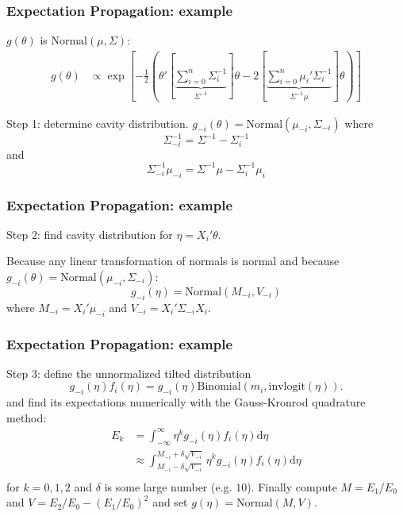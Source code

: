 \documentclass{beamer}
\begin{document}
\begin{frame}[fragile]
\frametitle{Expectation Propagation: example}


$g(\theta)$ is $\text{Normal}(\mu, \Sigma)$:
\begin{align*}
g(\theta) 
&\propto   \exp\left[-\frac{1}{2}\left( \theta'\left[\underbrace{ \sum_{i=0}^n \Sigma^{-1}_i}_{\Sigma^{-1} }\right] \theta - 2 \left[\underbrace{\sum_{i=0}^n\mu_i' \Sigma^{-1}_i}_{ \Sigma^{-1}\mu } \right]\theta \right) \right]
\end{align*}

Step 1: determine cavity distribution. $g_{-i}(\theta) = \text{Normal}(\mu_{-i}, \Sigma_{-i})$ where
$$
\Sigma_{-i}^{-1} = \Sigma^{-1} - \Sigma_{i}^{-1}
$$
and
$$
\Sigma_{-i}^{-1}\mu_{-i} = \Sigma^{-1}\mu - \Sigma_{i}^{-1}\mu_{i}
$$
\end{frame}

\begin{frame}[fragile]
\frametitle{Expectation Propagation: example}


Step 2: find cavity distribution for $\eta = X_i'\theta$. 
\newline

Because any linear transformation of normals is normal and because $g_{-i}(\theta) = \text{Normal}(\mu_{-i}, \Sigma_{-i})$:
$$
g_{-i}(\eta) = \text{Normal}(M_{-i}, V_{-i}) 
$$
where 
$M_{-i} = X_i'\mu_{-i}$ and $V_{-i} = X_i'\Sigma_{-i}X_i$.

\end{frame}

\begin{frame}[fragile]
\frametitle{Expectation Propagation: example}


Step 3: define the unnormalized tilted distribution
$$
g_{-i}(\eta)f_i(\eta) = g_{-i}(\eta)\text{Binomial}(m_i, \text{invlogit}(\eta)).
$$
and find its expectations numerically with the Gauss-Kronrod quadrature method:
\begin{align*}
E_k &= \int_{-\infty}^{\infty} \eta^k g_{-i}(\eta)f_i(\eta) \text{d}\eta \\
&\approx \int_{M_{-i}- \delta \sqrt{V_{-i}} }^{M_{-i}+ \delta \sqrt{V_{-i}}} \eta^k g_{-i}(\eta)f_i(\eta) \text{d}\eta \\
\end{align*}
for $k=0,1,2$ and $\delta$ is some large number (e.g. $10$). Finally compute $M = E_1/E_0$ and $V = E_2/E_0 - (E_1/E_0)^2$ and set $g(\eta) = \text{Normal}(M,V)$.

\end{frame}
\end{document}
